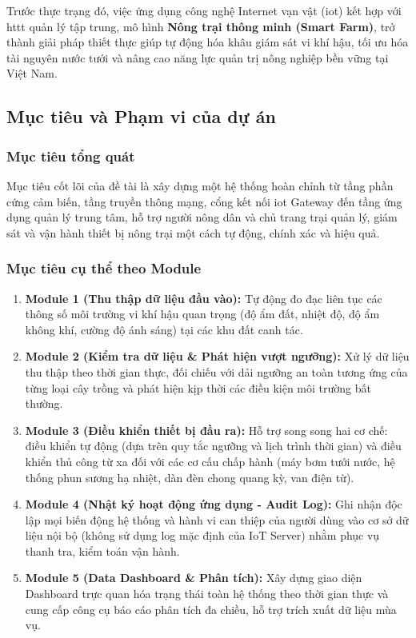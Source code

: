 Trước thực trạng đó, việc ứng dụng công nghệ Internet vạn vật (\gls{iot}) kết hợp với \gls{httt} quản lý tập trung, mô hình \textbf{Nông trại thông minh (Smart Farm)}, trở thành giải pháp thiết thực giúp tự động hóa khâu giám sát vi khí hậu, tối ưu hóa tài nguyên nước tưới và nâng cao năng lực quản trị nông nghiệp bền vững tại Việt Nam.

\subsection{Mục tiêu và Phạm vi của dự án}

\subsubsection{Mục tiêu tổng quát}
Mục tiêu cốt lõi của đề tài là xây dựng một hệ thống hoàn chỉnh từ tầng phần cứng cảm biến, tầng truyền thông mạng, cổng kết nối \gls{iot} Gateway đến tầng ứng dụng quản lý trung tâm, hỗ trợ người nông dân và chủ trang trại quản lý, giám sát và vận hành thiết bị nông trại một cách tự động, chính xác và hiệu quả.

\subsubsection{Mục tiêu cụ thể theo Module}
\begin{enumerate}[leftmargin=*]
    \item \textbf{Module 1 (Thu thập dữ liệu đầu vào):} Tự động đo đạc liên tục các thông số môi trường vi khí hậu quan trọng (độ ẩm đất, nhiệt độ, độ ẩm không khí, cường độ ánh sáng) tại các khu đất canh tác.
    \item \textbf{Module 2 (Kiểm tra dữ liệu \& Phát hiện vượt ngưỡng):} Xử lý dữ liệu thu thập theo thời gian thực, đối chiếu với dải ngưỡng an toàn tương ứng của từng loại cây trồng và phát hiện kịp thời các điều kiện môi trường bất thường.
    \item \textbf{Module 3 (Điều khiển thiết bị đầu ra):} Hỗ trợ song song hai cơ chế: điều khiển tự động (dựa trên quy tắc ngưỡng và lịch trình thời gian) và điều khiển thủ công từ xa đối với các cơ cấu chấp hành (máy bơm tưới nước, hệ thống phun sương hạ nhiệt, dàn đèn chong quang kỳ, van điện từ).
    \item \textbf{Module 4 (Nhật ký hoạt động ứng dụng - Audit Log):} Ghi nhận độc lập mọi biến động hệ thống và hành vi can thiệp của người dùng vào cơ sở dữ liệu nội bộ (không sử dụng log mặc định của IoT Server) nhằm phục vụ thanh tra, kiểm toán vận hành.
    \item \textbf{Module 5 (Data Dashboard \& Phân tích):} Xây dựng giao diện Dashboard trực quan hóa trạng thái toàn hệ thống theo thời gian thực và cung cấp công cụ báo cáo phân tích đa chiều, hỗ trợ trích xuất dữ liệu mùa vụ.
\end{enumerate}

